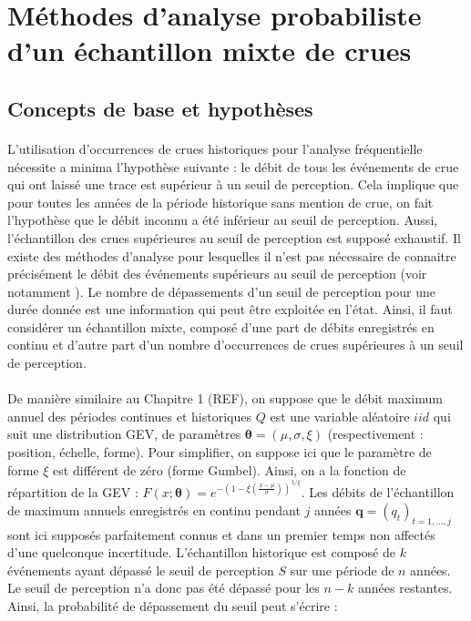 \documentclass[11pt]{article}
\begin{document}
\section{Méthodes d'analyse probabiliste d'un échantillon mixte de crues}
	
	
	\subsection{Concepts de base et hypothèses}
	
	\paragraph{} 
	
		L'utilisation d'occurrences de crues historiques pour l'analyse fréquentielle nécessite a minima l'hypothèse suivante : le débit de tous les événements de crue qui ont laissé une trace est supérieur à un seuil de perception. Cela implique que pour toutes les années de la période historique sans mention de crue, on fait l'hypothèse que le débit inconnu a été inférieur au seuil de perception. Aussi, l'échantillon des crues supérieures au seuil de perception est supposé exhaustif. Il existe des méthodes d'analyse pour lesquelles il n'est pas nécessaire de connaitre précisément le débit des événements supérieurs au seuil de perception (voir notamment \citet{stedinger_flood_1986}). Le nombre de dépassements d'un seuil de perception pour une durée donnée est une information qui peut être exploitée en l'état. Ainsi, il faut considérer un échantillon mixte, composé d'une part de débits enregistrés en continu et d'autre part d'un nombre d'occurrences de crues supérieures à un seuil de perception. 
			
		\paragraph{}
		De manière similaire au Chapitre 1 (REF), on suppose que le débit maximum annuel des périodes continues et historiques $Q$ est une variable aléatoire $iid$ qui suit une distribution GEV, de paramètres $\boldsymbol{\theta} = (\mu,\sigma,\xi)$ (respectivement : position, échelle, forme). Pour simplifier, on suppose ici que le paramètre de forme $\xi$ est différent de zéro (forme Gumbel). Ainsi, on a la fonction de répartition de la GEV : $F(x;\boldsymbol{\theta}) = e^{-(1-\xi(\frac{x - \mu}{\sigma}))^{1/\xi}}$. Les débits de l'échantillon de maximum annuels enregistrés en continu pendant $j$ années $\boldsymbol{q}= (q_t)_{t=1,...,j}$ sont ici supposés parfaitement connus et dans un premier temps non affectés d'une quelconque incertitude. L'échantillon historique est composé de $k$ événements ayant dépassé le seuil de perception $S$ sur une période de $n$ années. Le seuil de perception n'a donc pas été dépassé pour les $n-k$ années restantes. Ainsi, la probabilité de dépassement du seuil peut s'écrire :
		
\end{document}
